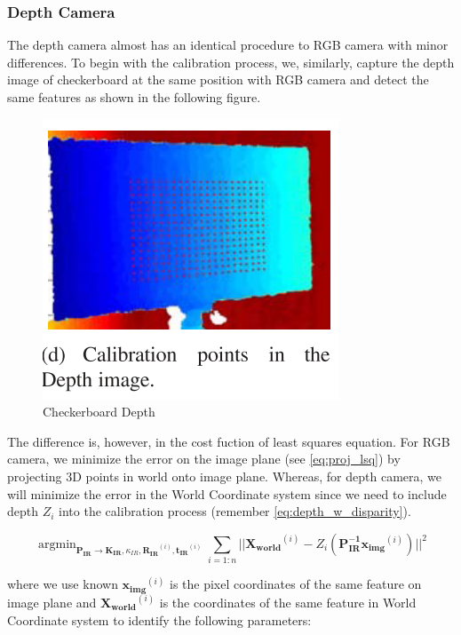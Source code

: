\documentclass[a4paper]{report}
\numberwithin{figure}{section}
\newcommand{\argmin}{\mathop{\mathrm{argmin}}}
\begin{document}
\subsubsection{Depth Camera}

The depth camera almost has an identical procedure to RGB camera with minor 
differences. 
To begin with the calibration process, 
we, similarly, capture the depth image of checkerboard at the same position 
with RGB camera and detect the same features as shown in the following figure.

\begin{figure}[H]
	\centering
  \includegraphics[width=0.5\linewidth,natwidth=640,natheight=640]
  {fig/ref_imgs/checkerboard_depth.png}
  \caption{Checkerboard Depth}
  \label{fig:checkerboard_depth}
\end{figure}

The difference is, however, in the cost fuction of least squares equation. 
For RGB camera, we minimize the error on the image plane (see \ref{eq:proj_lsq}) 
by projecting 3D points in world onto image plane. Whereas, for depth camera, 
we will minimize the error in the World Coordinate system since we need to 
include depth $Z_i$ into the calibration process (remember \ref{eq:depth_w_disparity}).


\begin{equation}
  \argmin_{\mathbf{P_{IR}} \rightarrow \mathbf{K_{IR}}, \kappa_{IR}, \mathbf{R_{IR}}^{(i)}, \mathbf{t_{IR}}^{(i)}}
  \sum_{i=1:n} || \mathbf{X_{world}}^{(i)} - 
  Z_i (\mathbf{P_{IR}^{-1}} \mathbf{x_{img}}^{(i)}) ||^2
\end{equation}\label{eq:proj_lsq}

where we use known 
$\mathbf{x_{img}}^{(i)}$ is the pixel coordinates of the same feature on image plane and 
$\mathbf{X_{world}}^{(i)}$ is the coordinates of the same feature in World Coordinate system
to identify the following parameters:
\end{document}
